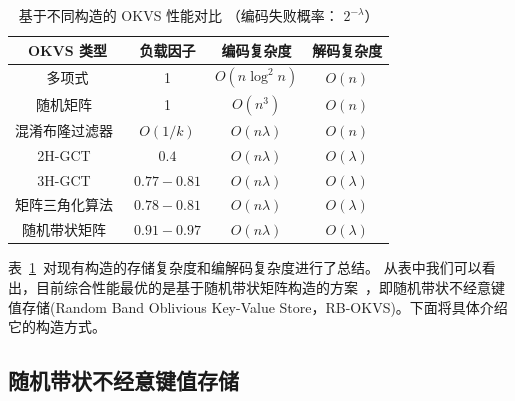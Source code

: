 \begin{table}[ht]
  \centering
  \caption{基于不同构造的 OKVS 性能对比 （编码失败概率： $2^{-\lambda}$）}
  \label{tab:okvs_comparison}
  \begin{tabular}{cccc}
    \toprule
    OKVS 类型  &  负载因子  &  编码复杂度 & 解码复杂度 \\
    \midrule
    多项式 & 1 & $O(n\log^2n)$ & $O(n)$ \\
    随机矩阵~\cite{garimella2021oblivious} & 1 & $O(n^3)$ & $O(n)$ \\
    混淆布隆过滤器~\cite{dong2013when} & $O(1/k)$ & $O(n\lambda)$ & $O(n)$ \\
    2H-GCT~\cite{pinkas2020psi} & $0.4$ & $O(n\lambda)$ & $O(\lambda)$ \\
    3H-GCT~\cite{garimella2021oblivious} & $0.77-0.81$ & $O(n\lambda)$ & $O(\lambda)$ \\
    矩阵三角化算法~\cite{raghuraman2022blazing} & $0.78-0.81$ & $O(n\lambda)$ & $O(\lambda)$ \\
    随机带状矩阵~\cite{bienstock2023NearOptimal} & $0.91-0.97$ & $O(n\lambda)$ & $O(\lambda)$ \\
    \bottomrule
  \end{tabular}
\end{table}

表~\ref{tab:okvs_comparison}~对现有构造的存储复杂度和编解码复杂度进行了总结。
从表中我们可以看出，目前综合性能最优的是基于随机带状矩阵构造的方案~\cite{bienstock2023NearOptimal}，即随机带状不经意键值存储(Random Band Oblivious Key-Value Store，RB-OKVS)。下面将具体介绍它的构造方式。

\subsection{随机带状不经意键值存储}


